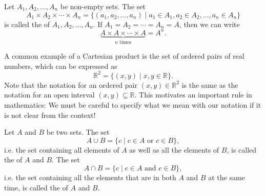 \begin{definition}
Let $ A_1,A_2,\ldots,A_n $ be non-empty sets. The set
\begin{equation*}
    A_1\times A_2\times \cdots\times A_n=\{(a_1,a_2,\ldots,a_n)\mid a_1\in A_1,a_2\in A_2,\ldots,a_n\in A_n\}
\end{equation*}
is called the  of $ A_1,A_2,\ldots,A_n $. If $ A_1=A_2=\cdots=A_n=A $, then we can write
\begin{equation*}
    \underbrace{A\times A\times\cdots\times A}_{n\text{ times}}=A^n.
\end{equation*}
\end{definition}

A common example of a Cartesian product is the set of ordered pairs of real numbers, which can be expressed as
\begin{equation*}
    \mathbb{R}^2=\{(x,y)\mid x,y\in\mathbb{R}\}.
\end{equation*}
Note that the notation for an ordered pair $ (x,y)\in\mathbb{R}^2 $ is the same as the notation for an open interval $ (x,y)\subseteq\mathbb{R} $. This motivates an important rule in mathematics: We must be careful to specify what we mean with our notation if it is not clear from the context!

\begin{definition}
Let $ A $ and $ B $ be two sets. The set
\begin{equation*}
    A\cup B=\{c\mid c\in A\text{ or }c\in B\},
\end{equation*}
i.e. the set containing all elements of $ A $ as well as all the elements of $ B $, is called the  of $ A $ and $ B $. The set
\begin{equation*}
    A\cap B=\{c\mid c\in A\text{ and }c\in B\},
\end{equation*}
i.e. the set containing all the elements that are in both $ A $ and $ B $ at the same time, is called the  of $ A $ and $ B $.
\end{definition}

